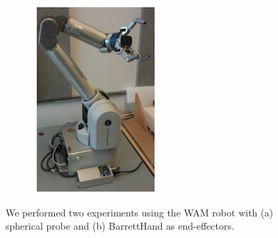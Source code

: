\begin{figure}[]
\begin{subfigure}[]{0.490\linewidth}
        \includegraphics[width=\linewidth]{images/wam_h}
        \caption{}
    \end{subfigure}
    \label{fig:wam}
    \caption{We performed two experiments using the WAM robot with (a) spherical probe and (b) BarrettHand as end-effectors.}
\end{figure}



